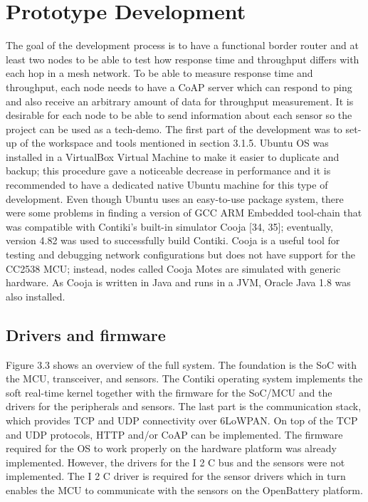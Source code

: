 \section{Prototype Development}

The goal of the development process is to have a functional border router and at least two nodes to be able to test how response time and throughput differs with each hop in a mesh network.
To be able to measure response time and throughput,
	each node needs to have a CoAP server which can respond to ping and also receive an arbitrary amount of data for throughput measurement.
It is desirable for each node to be able to send information about each sensor so the project can be used as a tech-demo.
The first part of the development was to set-up of the workspace and tools mentioned in section 3.1.5.
Ubuntu OS was installed in a VirtualBox Virtual Machine to make it easier to duplicate and backup;
	this procedure gave a noticeable decrease in performance and it is recommended to have a dedicated native Ubuntu machine for this type of development.
Even though Ubuntu uses an easy-to-use package system,
	there were some problems in finding a version of GCC ARM Embedded tool-chain that was compatible with Contiki’s built-in simulator Cooja [34, 35];
	eventually,
	version 4.82 was used to successfully build Contiki.
Cooja is a useful tool for testing and debugging network configurations but does not have support for the CC2538 MCU;
	instead,
	nodes called Cooja Motes are simulated with generic hardware.
As Cooja is written in Java and runs in a JVM,
	Oracle Java 1.8 was also installed.
	
\subsection{Drivers and firmware}

Figure 3.3 shows an overview of the full system.
The foundation is the SoC with the MCU,
	transceiver,
	and sensors.
The Contiki operating system implements the soft real-time kernel together with the firmware for the SoC/MCU and the drivers for the peripherals and sensors.
The last part is the communication stack,
	which provides TCP and UDP connectivity over 6LoWPAN.
On top of the TCP and UDP protocols,
	HTTP and/or CoAP can be implemented.
The firmware required for the OS to work properly on the hardware platform was already implemented.
However,
	the drivers for the I 2 C bus and the sensors were not implemented.
The I 2 C driver is required for the sensor drivers which in turn enables the MCU to communicate with the sensors on the OpenBattery platform.

